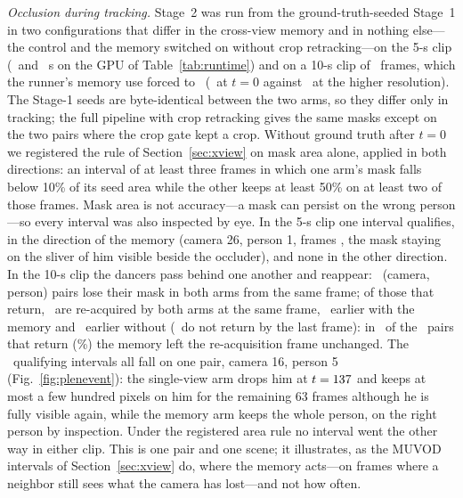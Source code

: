 \documentclass[journal]{IEEEtran}
\begin{document}
\textit{Occlusion during tracking.} Stage~2 was run from the
ground-truth-seeded Stage~1 in two configurations that differ in the
cross-view memory and in nothing else---the control and the memory switched on
without crop retracking---on the 5-s clip (\plenRuntimeCtrl\ and
\plenRuntimeHead\ s on the GPU of Table~\ref{tab:runtime}) and on a 10-s clip
of \plenLFrames\ frames, which the runner's memory use forced to \plenLRes\
(\plenLJgt\ at $t=0$ against \plenJgt\ at the higher resolution). The Stage-1
seeds are byte-identical between the two arms, so they differ only in
tracking; the full pipeline with crop retracking gives the same masks except
on the two pairs where the crop gate kept a crop. Without ground truth after
$t=0$ we registered the rule of Section~\ref{sec:xview} on mask area alone,
applied in both directions: an interval of at least three frames in which one
arm's mask falls below 10\% of its seed area while the other keeps at least
50\% on at least two of those frames. Mask area is not accuracy---a mask can
persist on the wrong person---so every interval was also inspected by eye. In
the 5-s clip one interval qualifies, in the direction of the memory (camera
26, person 1, frames \plenEventFrames, the mask staying on the sliver of him
visible beside the occluder), and none in the other direction. In the 10-s
clip the dancers pass behind one another and reappear: \plenLBothLost\
(camera, person) pairs lose their mask in both arms from the same frame; of
those that return, \plenLTie\ are re-acquired by both arms at the same frame,
\plenLHeadFirst\ earlier with the memory and \plenLCtrlFirst\ earlier without
(\plenLNeither\ do not return by the last frame): in \plenLTie\ of the
\plenLReturned\ pairs that return (\plenLTiePct\%) the memory left the
re-acquisition frame unchanged. The
\plenLEventsFor\ qualifying intervals all fall on one pair, camera 16, person
5 (Fig.~\ref{fig:plenevent}): the single-view arm drops him at
$t=137$ and keeps at most a few hundred pixels on him for the
remaining 63 frames although he is fully visible again, while the memory arm
keeps the whole person, on the right person by inspection. Under the
registered area rule no interval went the other way in either clip. This is
one pair and one scene; it illustrates, as the MUVOD intervals of
Section~\ref{sec:xview} do, where the memory acts---on frames where a neighbor
still sees what the camera has lost---and not how often.
\end{document}
